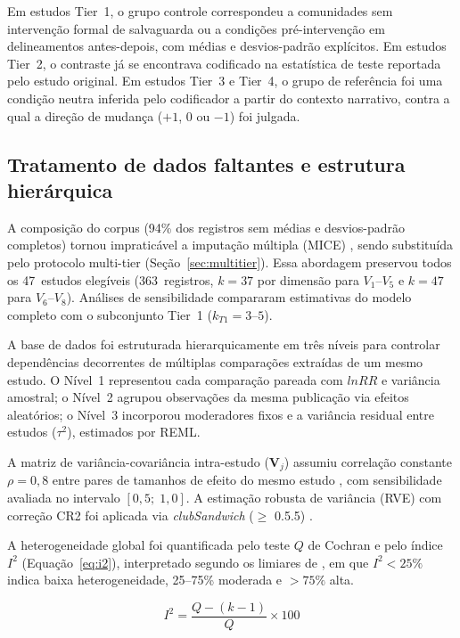\documentclass[12pt,a4paper]{article}
\begin{document}
Em estudos Tier~1, o grupo controle correspondeu a comunidades sem intervenção formal de salvaguarda ou a condições pré-intervenção em delineamentos antes-depois, com médias e desvios-padrão explícitos. Em estudos Tier~2, o contraste já se encontrava codificado na estatística de teste reportada pelo estudo original. Em estudos Tier~3 e Tier~4, o grupo de referência foi uma condição neutra inferida pelo codificador a partir do contexto narrativo, contra a qual a direção de mudança ($+1$, $0$ ou $-1$) foi julgada.

\subsection{Tratamento de dados faltantes e estrutura hierárquica}
\label{sec:missing}

A composição do corpus (94\% dos registros sem médias e desvios-padrão completos) tornou impraticável a imputação múltipla (MICE) \citep{vanBuuren2011}, sendo substituída pelo protocolo multi-tier (Seção~\ref{sec:multitier}). Essa abordagem preservou todos os 47~estudos elegíveis (363~registros, $k = 37$ por dimensão para $V_1$--$V_5$ e $k = 47$ para $V_6$--$V_8$). Análises de sensibilidade compararam estimativas do modelo completo com o subconjunto Tier~1 ($k_{T1} = 3\text{--}5$).

A base de dados foi estruturada hierarquicamente em três níveis \citep{Pustejovsky2022} para controlar dependências decorrentes de múltiplas comparações extraídas de um mesmo estudo. O Nível~1 representou cada comparação pareada com $lnRR$ e variância amostral; o Nível~2 agrupou observações da mesma publicação via efeitos aleatórios; o Nível~3 incorporou moderadores fixos e a variância residual entre estudos ($\tau^2$), estimados por REML. 

A matriz de variância-covariância intra-estudo ($\mathbf{V}_j$) assumiu correlação constante $\rho = 0{,}8$ entre pares de tamanhos de efeito do mesmo estudo \citep{Pustejovsky2022}, com sensibilidade avaliada no intervalo $[0{,}5;\; 1{,}0]$. A estimação robusta de variância (RVE) com correção CR2 foi aplicada via \textit{clubSandwich} ($\geq$ 0.5.5) \citep{Pustejovsky2022}.

A heterogeneidade global foi quantificada pelo teste $Q$ de Cochran e pelo índice $I^2$ (Equação~\ref{eq:i2}), interpretado segundo os limiares de \citet{Higgins2003}, em que $I^2 < 25\%$ indica baixa heterogeneidade, 25--75\% moderada e $> 75\%$ alta.

\begin{equation}
I^2 = \frac{Q - (k-1)}{Q} \times 100
\label{eq:i2}
\end{equation}
\end{document}

